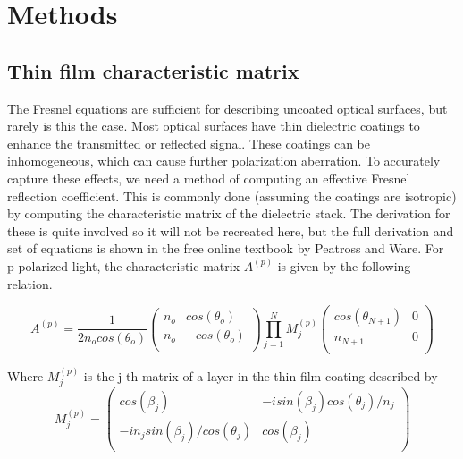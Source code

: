 \section{Methods}
\label{sec:methods}

\subsection{Thin film characteristic matrix}
The Fresnel equations are sufficient for describing uncoated optical surfaces, but rarely is this the case. Most optical surfaces have thin dielectric coatings to enhance the transmitted or reflected signal. These coatings can be inhomogeneous, which can cause further polarization aberration. To accurately capture these effects, we need a method of computing an effective Fresnel reflection coefficient. This is commonly done (assuming the coatings are isotropic) by computing the characteristic matrix of the dielectric stack\cite{BYU,Chipman}. The derivation for these is quite involved so it will not be recreated here, but the full derivation and set of equations is shown in the free online textbook by Peatross and Ware\cite{BYU}. For p-polarized light, the characteristic matrix $A^{(p)}$ is given by the following relation.

\begin{equation}
    A^{(p)} = \frac{1}{2n_{o}cos(\theta_{o})}
    \begin{pmatrix}
        n_{o} & cos(\theta_{o}) \\
        n_{o} & -cos(\theta_{o}) \\
    \end{pmatrix}
    \prod_{j=1}^{N} M_{j}^{(p)}
    \begin{pmatrix}
        cos(\theta_{N+1}) & 0 \\
        n_{N+1} & 0 \\
    \end{pmatrix}
\end{equation}

Where $M_{j}^{(p)}$ is the j-th matrix of a layer in the thin film coating described by
\begin{equation}
    M_{j}^{(p)} = 
    \begin{pmatrix}
        cos(\beta_{j}) & -isin(\beta_{j})cos(\theta_{j})/n_{j} \\
        -in_{j}sin(\beta_{j})/cos(\theta_{j}) &  cos(\beta_{j})  \\
    \end{pmatrix}
\end{equation}

